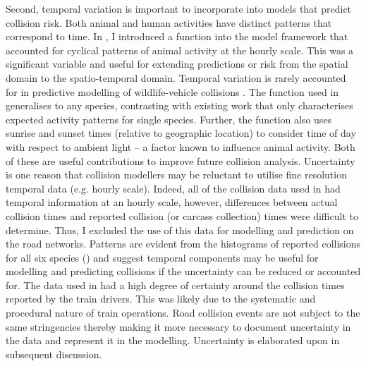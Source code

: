 Second, temporal variation is important to incorporate into models that predict collision risk. Both animal and human activities have distinct patterns that correspond to time. In , I introduced a function into the model framework that accounted for cyclical patterns of animal activity at the hourly scale. This was a significant variable and useful for extending predictions or risk from the spatial domain to the spatio-temporal domain. Temporal variation is rarely accounted for in predictive modelling of wildlife-vehicle collisions \citep[but see][]{beau10,gund98,neum12}. The function used in  generalises to any species, contrasting with existing work that only characterises expected activity patterns for single species. Further, the function also uses sunrise and sunset times (relative to geographic location) to consider time of day with respect to ambient light -- a factor known to influence animal activity. Both of these are useful contributions to improve future collision analysis. Uncertainty is one reason that collision modellers may be reluctant to utilise fine resolution temporal data (e.g. hourly scale). Indeed, all of the collision data used in  had temporal information at an hourly scale, however, differences between actual collision times and reported collision (or carcass collection) times were difficult to determine. Thus, I excluded the use of this data for modelling and prediction on the road networks. Patterns are evident from the histograms of reported collisions for all six species () and suggest temporal components may be useful for modelling and predicting collisions if the uncertainty can be reduced or accounted for. The data used in  had a high degree of certainty around the collision times reported by the train drivers. This was likely due to the systematic and procedural nature of train operations. Road collision events are not subject to the same stringencies thereby making it more necessary to document uncertainty in the data and represent it in the modelling. Uncertainty is elaborated upon in subsequent discussion. 

